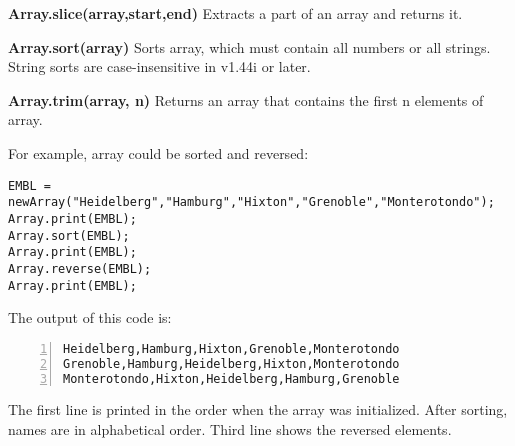 \begin{shaded}
\begin{indentCom}
\item \textbf{Array.slice(array,start,end)} Extracts a part of an array and
returns it. 
\item \textbf{Array.sort(array)} Sorts array, which must contain all numbers
or all strings. String sorts are case-insensitive in v1.44i or later.
\item \textbf{Array.trim(array, n)} Returns an array that contains the first n
elements of array.
\end{indentCom}\end{shaded}

For example, array could be sorted and reversed:

\begin{lstlisting}[numbers=none]
EMBL = newArray("Heidelberg","Hamburg","Hixton","Grenoble","Monterotondo");
Array.print(EMBL);
Array.sort(EMBL);
Array.print(EMBL);
Array.reverse(EMBL);
Array.print(EMBL);
\end{lstlisting} 
The output of this code is:
\begin{lstlisting}[numbers=left]
Heidelberg,Hamburg,Hixton,Grenoble,Monterotondo
Grenoble,Hamburg,Heidelberg,Hixton,Monterotondo
Monterotondo,Hixton,Heidelberg,Hamburg,Grenoble
\end{lstlisting} 
The first line is printed in the order when the array was initialized. After
sorting, names are in alphabetical order. Third line shows the reversed
elements. 
